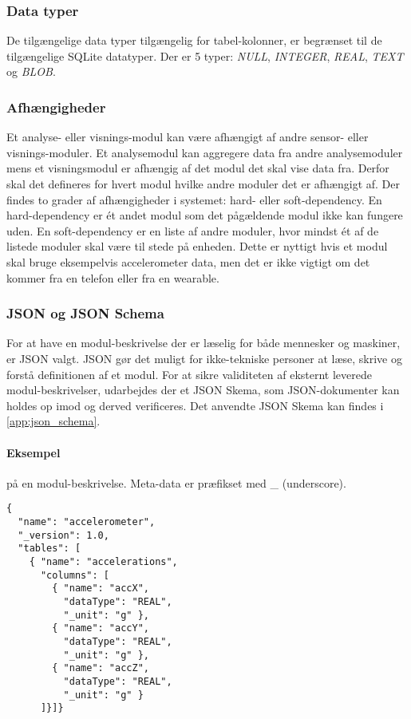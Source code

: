 \subsubsection{Data typer}
De tilgængelige data typer tilgængelig for tabel-kolonner, er begrænset til de tilgængelige SQLite datatyper.
Der er 5 typer: \textit{NULL}, \textit{INTEGER}, \textit{REAL}, \textit{TEXT} og \textit{BLOB}.

\subsubsection{Afhængigheder}
Et analyse- eller visnings-modul kan være afhængigt af andre sensor- eller visnings-moduler.
Et analysemodul kan aggregere data fra andre analysemoduler mens et visningsmodul er afhængig af det modul det skal vise data fra.
Derfor skal det defineres for hvert modul hvilke andre moduler det er afhængigt af.
Der findes to grader af afhængigheder i systemet: hard- eller soft-dependency.
En hard-dependency er ét andet modul som det pågældende modul ikke kan fungere uden.
En soft-dependency er en liste af andre moduler, hvor mindst ét af de listede moduler skal være til stede på enheden.
Dette er nyttigt hvis et modul skal bruge eksempelvis accelerometer data, men det er ikke vigtigt om det kommer fra en telefon eller fra en wearable.

\subsubsection{JSON og JSON Schema}
For at have en modul-beskrivelse der er læselig for både mennesker og maskiner, er JSON valgt.
JSON gør det muligt for ikke-tekniske personer at læse, skrive og forstå definitionen af et modul.
For at sikre validiteten af eksternt leverede modul-beskrivelser, udarbejdes der et JSON Skema, som JSON-dokumenter kan holdes op imod og derved verificeres.
Det anvendte JSON Skema kan findes i \cref{app:json_schema}.

\paragraph{Eksempel} på en modul-beskrivelse.
Meta-data er præfikset med \_ (underscore).
\begin{lstlisting}
{
  "name": "accelerometer",
  "_version": 1.0,
  "tables": [
    { "name": "accelerations",
      "columns": [
        { "name": "accX",
          "dataType": "REAL",
          "_unit": "g" },
        { "name": "accY",
          "dataType": "REAL",
          "_unit": "g" },
        { "name": "accZ",
          "dataType": "REAL",
          "_unit": "g" }
      ]}]}
\end{lstlisting}

